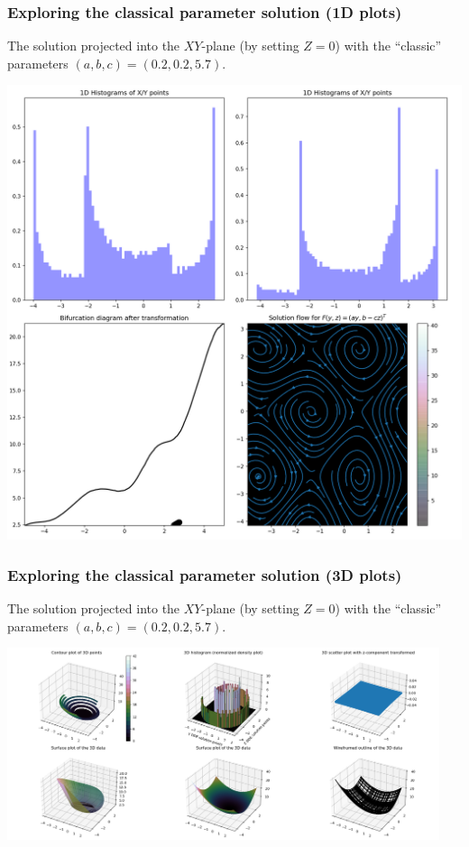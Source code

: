 \documentclass[usenames,svgnames,dvipsnames,10pt]{beamer}
\begin{document}
\begin{frame}[fragile]
\frametitle{Exploring the classical parameter solution (1D plots)}

The solution projected into the $XY$-plane (by setting $Z=0$) with the ``classic'' 
parameters $(a, b, c) = (0.2, 0.2, 5.7)$. \\ 
\begin{center}
\includegraphics[height=0.75\textheight]{../Images/RosslerAttractorSummary-TypeXY-Plot1D-A0-200B0-200C5-700-2021-10-27-044726.png}
\end{center}

\end{frame}

\begin{frame}[fragile]
\frametitle{Exploring the classical parameter solution (3D plots)}

The solution projected into the $XY$-plane (by setting $Z=0$) with the ``classic'' 
parameters $(a, b, c) = (0.2, 0.2, 5.7)$. \\ 
\begin{center}
\includegraphics[width=0.95\textwidth]{../Images/RosslerAttractorSummary-TypeXY-Plot3D-A0-200B0-200C5-700-2021-10-27-044740.png}
\end{center}

\end{frame}
\end{document}
